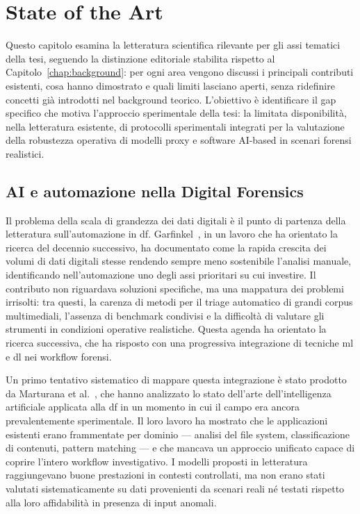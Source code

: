 \chapter{State of the Art}
\label{chap:state-of-the-art}

Questo capitolo esamina la letteratura scientifica rilevante per gli assi tematici della tesi, seguendo la distinzione editoriale stabilita rispetto al Capitolo~\ref{chap:background}: per ogni area vengono discussi i principali contributi esistenti, cosa hanno dimostrato e quali limiti lasciano aperti, senza ridefinire concetti già introdotti nel background teorico. L'obiettivo è identificare il gap specifico che motiva l'approccio sperimentale della tesi: la limitata disponibilità, nella letteratura esistente, di protocolli sperimentali integrati per la valutazione della robustezza operativa di modelli proxy e software AI-based in scenari forensi realistici.


\section{AI e automazione nella Digital Forensics}
\label{sec:sota-ai-df}

Il problema della scala di grandezza dei dati digitali è il punto di partenza della letteratura sull'automazione in \gls{df}. Garfinkel~\cite{garfinkel2010digital}, in un lavoro che ha orientato la ricerca del decennio successivo, ha documentato come la rapida crescita dei volumi di dati digitali stesse rendendo sempre meno sostenibile l'analisi manuale, identificando nell'automazione uno degli assi prioritari su cui investire. Il contributo non riguardava soluzioni specifiche, ma una mappatura dei problemi irrisolti: tra questi, la carenza di metodi per il triage automatico di grandi corpus multimediali, l'assenza di benchmark condivisi e la difficoltà di valutare gli strumenti in condizioni operative realistiche. Questa agenda ha orientato la ricerca successiva, che ha risposto con una progressiva integrazione di tecniche \gls{ml} e \gls{dl} nei workflow forensi.

Un primo tentativo sistematico di mappare questa integrazione è stato prodotto da Marturana et al.~\cite{marturana2011digital}, che hanno analizzato lo stato dell'arte dell'intelligenza artificiale applicata alla \gls{df} in un momento in cui il campo era ancora prevalentemente sperimentale. Il loro lavoro ha mostrato che le applicazioni esistenti erano frammentate per dominio — analisi del file system, classificazione di contenuti, pattern matching — e che mancava un approccio unificato capace di coprire l'intero workflow investigativo. I modelli proposti in letteratura raggiungevano buone prestazioni in contesti controllati, ma non erano stati valutati sistematicamente su dati provenienti da scenari reali né testati rispetto alla loro affidabilità in presenza di input anomali.

